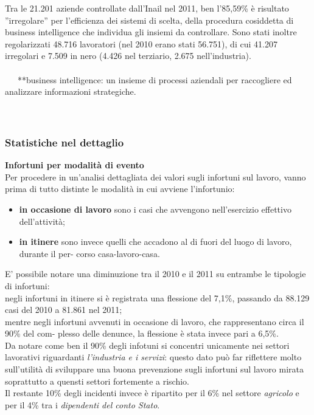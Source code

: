 Tra le 21.201 aziende controllate dall'Inail nel 2011, ben l’85,59\% è risultato ''irregolare'' per l’efficienza dei sistemi di scelta, della procedura cosiddetta di business intelligence che individua gli insiemi da controllare. Sono stati inoltre regolarizzati 48.716 lavoratori (nel 2010 erano stati 56.751), di cui 41.207 irregolari e 7.509 in nero (4.426 nel terziario, 2.675 nell’industria).\\\\



\
\
\
**business intelligence: un insieme di processi aziendali per raccogliere ed analizzare informazioni strategiche.\\\\

\ \
\subsubsection{Statistiche nel dettaglio}

\textbf{Infortuni per modalità di evento}\\
Per procedere in un’analisi dettagliata dei valori sugli infortuni sul lavoro, vanno prima di tutto distinte le modalità in cui avviene l’infortunio:

\begin{itemize}
\item \textbf{in occasione di lavoro} sono i casi che avvengono nell’esercizio effettivo dell’attività;
\item \textbf{in itinere} sono invece quelli che accadono al di fuori del luogo di lavoro, durante il per-
corso casa-lavoro-casa.
\end{itemize}


E' possibile notare una diminuzione tra il 2010 e il 2011 su entrambe le tipologie di infortuni:\\
negli infortuni in itinere si è registrata una flessione del 7,1\%, passando da 88.129 casi del 2010 a 81.861 nel 2011;\\
mentre negli infortuni avvenuti in occasione di lavoro, che rappresentano circa il 90\% del com-
plesso delle denunce, la flessione è stata invece pari a 6,5\%.\\
Da notare come ben il 90\% degli infotuni si concentri unicamente nei settori lavorativi riguardanti \textit{l'industria e i servizi}: questo dato può far riflettere molto sull'utilità di sviluppare una buona prevenzione sugli infortuni sul lavoro mirata soprattutto a quensti settori fortemente a rischio.\\
Il restante 10\% degli incidenti invece è ripartito per il 6\% nel settore \textit{agricolo} e per il 4\% tra i \textit{dipendenti del conto Stato}.


